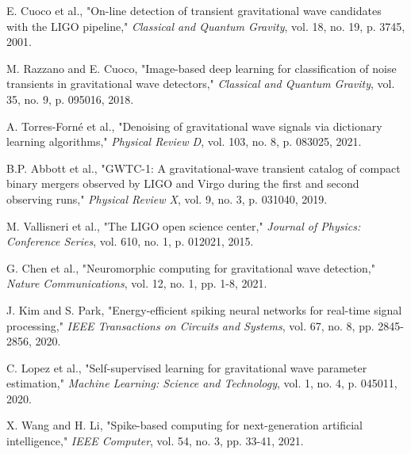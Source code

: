 \documentclass[12pt,a4paper]{article}
\begin{document}
\begin{thebibliography}{20}
E. Cuoco et al., "On-line detection of transient gravitational wave candidates with the LIGO pipeline," \textit{Classical and Quantum Gravity}, vol. 18, no. 19, p. 3745, 2001.

M. Razzano and E. Cuoco, "Image-based deep learning for classification of noise transients in gravitational wave detectors," \textit{Classical and Quantum Gravity}, vol. 35, no. 9, p. 095016, 2018.

A. Torres-Forné et al., "Denoising of gravitational wave signals via dictionary learning algorithms," \textit{Physical Review D}, vol. 103, no. 8, p. 083025, 2021.

B.P. Abbott et al., "GWTC-1: A gravitational-wave transient catalog of compact binary mergers observed by LIGO and Virgo during the first and second observing runs," \textit{Physical Review X}, vol. 9, no. 3, p. 031040, 2019.

M. Vallisneri et al., "The LIGO open science center," \textit{Journal of Physics: Conference Series}, vol. 610, no. 1, p. 012021, 2015.

G. Chen et al., "Neuromorphic computing for gravitational wave detection," \textit{Nature Communications}, vol. 12, no. 1, pp. 1-8, 2021.

J. Kim and S. Park, "Energy-efficient spiking neural networks for real-time signal processing," \textit{IEEE Transactions on Circuits and Systems}, vol. 67, no. 8, pp. 2845-2856, 2020.

C. Lopez et al., "Self-supervised learning for gravitational wave parameter estimation," \textit{Machine Learning: Science and Technology}, vol. 1, no. 4, p. 045011, 2020.

X. Wang and H. Li, "Spike-based computing for next-generation artificial intelligence," \textit{IEEE Computer}, vol. 54, no. 3, pp. 33-41, 2021.

\end{thebibliography}
\end{document}
